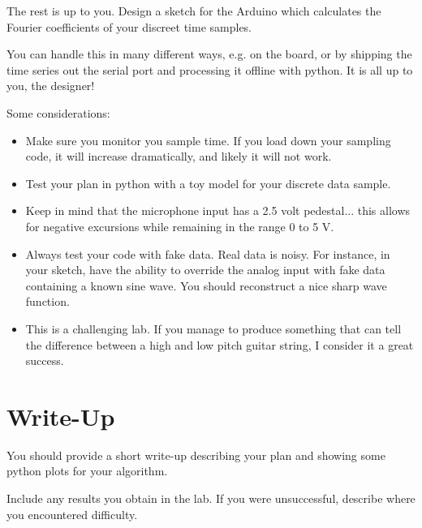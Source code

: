 \documentclass[12pt]{article}
\begin{document}
The rest is up to you.  Design a sketch for the Arduino which calculates the Fourier coefficients of your discreet time samples.

You can handle this in many different ways, e.g. on the board, or by shipping the time series out the serial port and processing it offline with python.
It is all up to you, the designer!

Some considerations:
\begin{itemize}
\item Make sure you monitor you sample time.  If you load down your sampling code, it will increase dramatically, and likely it will not work.
\item Test your plan in python with a toy model for your discrete data sample.
\item Keep in mind that the microphone input has a 2.5 volt pedestal...  this allows for negative excursions while remaining in the range 0 to 5 V.
\item Always test your code with fake data.  Real data is noisy.  For instance, in your sketch, have the ability to override the analog input with fake data containing a known sine wave.  You should reconstruct a nice sharp wave function.
\item This is a challenging lab.  If you manage to produce something that can tell the difference between a high and low pitch guitar string, I consider it a great success.
\end{itemize}

\section{Write-Up}

You should provide a short write-up describing your plan and showing some python plots for your algorithm.

Include any results you obtain in the lab.  If you were unsuccessful, describe where you encountered difficulty. 
\end{document}
